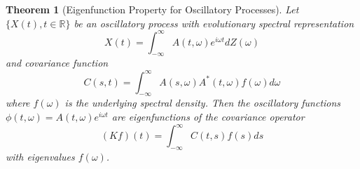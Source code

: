 \documentclass{article}
\newtheorem{theorem}{Theorem}
\begin{document}
\begin{theorem}
  [Eigenfunction Property for Oscillatory Processes] Let $\{X (t), t \in
  \mathbb{R}\}$ be an oscillatory process with evolutionary spectral
  representation
  \begin{equation}
    X (t) = \int_{- \infty}^{\infty} A (t, \omega) e^{i \omega t} dZ (\omega)
  \end{equation}
  and covariance function
  \begin{equation}
    C (s, t) = \int_{- \infty}^{\infty} A (s, \omega) A^{\ast} (t, \omega) f
    (\omega) d \omega
  \end{equation}
  where $f (\omega)$ is the underlying spectral density. Then the oscillatory
  functions $\phi (t, \omega) = A (t, \omega) e^{i \omega t}$ are
  eigenfunctions of the covariance operator
  \begin{equation}
    (Kf) (t) = \int_{- \infty}^{\infty} C (t, s) f (s) ds
  \end{equation}
  with eigenvalues $f (\omega)$.
\end{theorem}
\end{document}
